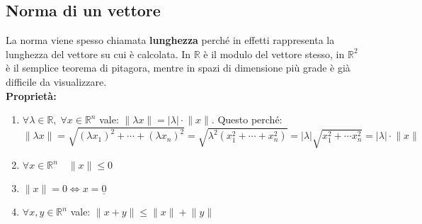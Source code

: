 \subsection{Norma di un vettore}
La norma viene spesso chiamata \textbf{lunghezza} perché in effetti rappresenta la lunghezza del vettore su cui è calcolata. In $\mathbb{R}$ è il modulo del vettore stesso, in $\mathbb{R}^2$ è il semplice teorema di pitagora, mentre in spazi di dimensione più grade è già difficile da visualizzare.\\

\textbf{Proprietà:} 
\begin{enumerate}
	\item $\forall \lambda \in \mathbb{R}, \;\forall x \in \mathbb{R}^n$ vale: $\lVert \lambda x \rVert = |\lambda| \cdot \lVert x \rVert$. Questo perché:
		\begin{equation*}
			\lVert \lambda x \rVert = \sqrt{(\lambda x_1)^2 + \cdots + (\lambda x_n)^2} = \sqrt{\lambda^2 (x_1^2 + \cdots + x_n^2)} = |\lambda| \sqrt{x_1^2 + \cdots x_n^2} = |\lambda| \cdot \lVert x \rVert
		\end{equation*}
	
	\item $\forall x \in \mathbb{R}^n \quad \lVert x \rVert \leq 0$
	
	\item $\lVert x \rVert = 0 \iff x = \underline{0}$

	\item $\forall x, y \in \mathbb{R}^n$ vale: $\lVert x + y \rVert \leq \lVert x \rVert + \lVert y \rVert$
\end{enumerate}

